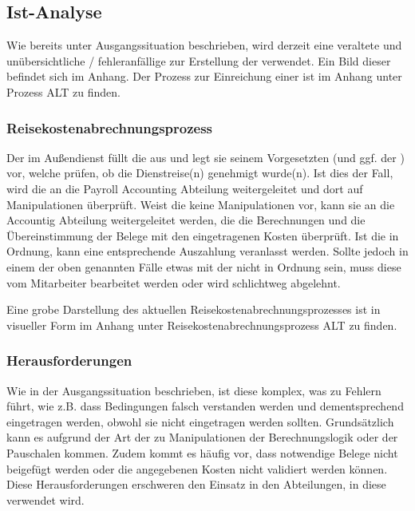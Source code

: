 \subsection{Ist-Analyse}

Wie bereits unter Ausgangssituation beschrieben, wird derzeit eine veraltete und unübersichtliche / fehleranfällige  zur Erstellung der  verwendet. Ein Bild dieser  befindet sich im Anhang. Der Prozess zur Einreichung einer  ist im Anhang unter Prozess ALT zu finden. \todo

\subsubsection{Reisekostenabrechnungsprozess}

Der  im Außendienst füllt die  aus und legt sie seinem Vorgesetzten (und ggf. der ) vor, welche prüfen, ob die Dienstreise(n) genehmigt wurde(n). Ist dies der Fall, wird die an die Payroll Accounting Abteilung weitergeleitet und dort auf Manipulationen überprüft. Weist die  keine Manipulationen vor, kann sie an die Accountig Abteilung weitergeleitet werden, die die Berechnungen und die Übereinstimmung der Belege mit den eingetragenen Kosten überprüft. Ist die  in Ordnung, kann eine entsprechende Auszahlung veranlasst werden. Sollte jedoch in einem der oben genannten Fälle etwas mit der  nicht in Ordnung sein, muss diese vom Mitarbeiter bearbeitet werden oder wird schlichtweg abgelehnt.

Eine grobe Darstellung des aktuellen Reisekostenabrechnungsprozesses ist in visueller Form im Anhang unter Reisekostenabrechnungsprozess ALT zu finden.\todo

\subsubsection{Herausforderungen}

Wie in der Ausgangssituation beschrieben, ist diese  komplex, was zu Fehlern führt, wie z.B. dass Bedingungen falsch verstanden werden und dementsprechend eingetragen werden, obwohl sie nicht eingetragen werden sollten. Grundsätzlich kann es aufgrund der Art der  zu Manipulationen der Berechnungslogik oder der Pauschalen kommen. Zudem kommt es häufig vor, dass notwendige Belege nicht beigefügt werden oder die angegebenen Kosten nicht validiert werden können. Diese Herausforderungen erschweren den Einsatz in den Abteilungen, in diese verwendet wird.

